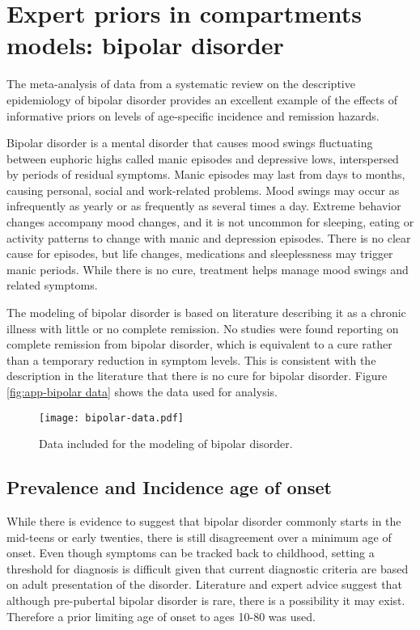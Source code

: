\chapter{Expert priors in compartments models: bipolar disorder}
\label{applications-prior_level_vals}

The meta-analysis of data from a systematic review on the descriptive
epidemiology of bipolar disorder provides an excellent example of the
effects of informative priors on levels of age-specific incidence and
remission hazards.

Bipolar disorder is a mental disorder that causes mood swings
fluctuating between euphoric highs called manic episodes and
depressive lows, interspersed by periods of residual symptoms.  Manic
episodes may last from days to months, causing personal, social and
work-related problems.  Mood swings may occur as infrequently as
yearly or as frequently as several times a day.  Extreme behavior
changes accompany mood changes, and it is not uncommon for sleeping,
eating or activity patterns to change with manic and depression
episodes.  There is no clear cause for episodes, but life changes,
medications and sleeplessness may trigger manic periods.  While there
is no cure, treatment helps manage mood swings and related
symptoms. \cite{kloos_bipolar_2011, angst_historical_2000}

The modeling of bipolar disorder is based on literature describing it
as a chronic illness with little or no complete remission.  No studies
were found reporting on complete remission from bipolar disorder,
which is equivalent to a cure rather than a temporary reduction in
symptom levels.  This is consistent with the description in the
literature that there is no cure for bipolar
disorder. \cite{american_diagnostic_2000} Figure \ref{fig:app-bipolar
  data} shows the data used for analysis.

    \begin{figure}[h]
        \begin{center}
            \texttt{[image: bipolar-data.pdf]}
            \caption{Data included for the modeling of bipolar
              disorder.}
            \label{fig:app-bipolar data}
        \end{center}
    \end{figure}

\section{Prevalence and Incidence age of onset}
While there is evidence to suggest that bipolar disorder commonly
starts in the mid-teens or early twenties, there is still disagreement
over a minimum age of onset. Even though symptoms can be tracked back
to childhood, setting a threshold for diagnosis is difficult given
that current diagnostic criteria are based on adult presentation of
the disorder. Literature and expert advice suggest that although
pre-pubertal bipolar disorder is rare, there is a possibility it may
exist. \cite{kloos_bipolar_2011, angst_historical_2000} Therefore a
prior limiting age of onset to ages 10-80 was used.

